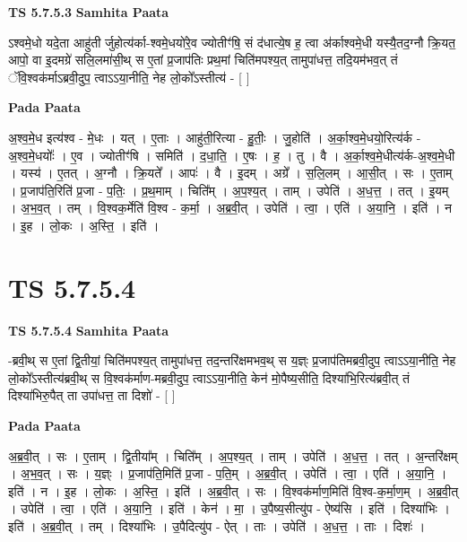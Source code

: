 \documentclass[17pt]{extarticle}
\begin{document}
\textbf{TS 5.7.5.3 } \newline
\textbf{Samhita Paata} \newline

ऽश्वमे॒धो यदे॒ता आहु॑ती र्जुहोत्य॑र्का-श्वमे॒धयो॑रे॒व ज्योतीꣳ॑षि॒ सं द॑धात्ये॒ष ह॒ त्वा अ॑र्काश्वमे॒धी यस्यै॒तद॒ग्नौ क्रि॒यत॒ आपो॒ वा इ॒दमग्रे॑ सलि॒लमा॑सी॒थ् स ए॒तां प्र॒जाप॑तिः प्रथ॒मां चिति॑मपश्य॒त् तामुपा॑धत्त॒ तदि॒यम॑भव॒त् तं ॅवि॒श्वक॑र्माऽब्रवी॒दुप॒ त्वाऽऽया॒नीति॒ नेह लो॒को᳚ऽस्तीत्य॑ - [  ] \newline

\textbf{Pada Paata} \newline

अ॒श्व॒मे॒ध इत्य॑श्व - मे॒धः । यत् । ए॒ताः । आहु॑ती॒रित्या - हु॒तीः॒ । जु॒होति॑ । अ॒र्का॒श्व॒मे॒धयो॒रित्य॑र्क - अ॒श्व॒मे॒धयोः᳚ । ए॒व । ज्योतीꣳ॑षि । समिति॑ । द॒धा॒ति॒ । ए॒षः । ह॒ । तु । वै । अ॒र्का॒श्व॒मे॒धीत्य॑र्क-अ॒श्व॒मे॒धी । यस्य॑ । ए॒तत् । अ॒ग्नौ । क्रि॒यते᳚ । आपः॑ । वै । इ॒दम् । अग्रे᳚ । स॒लि॒लम् । आ॒सी॒त् । सः । ए॒ताम् । प्र॒जाप॑ति॒रिति॑ प्र॒जा - प॒तिः॒ । प्र॒थ॒माम् । चिति᳚म् । अ॒प॒श्य॒त् । ताम् । उपेति॑ । अ॒ध॒त्त॒ । तत् । इ॒यम् । अ॒भ॒व॒त् । तम् । वि॒श्वक॒र्मेति॑ वि॒श्व - क॒र्मा॒ । अ॒ब्र॒वी॒त् । उपेति॑ । त्वा॒ । एति॑ । अ॒या॒नि॒ । इति॑ । न । इ॒ह । लो॒कः । अ॒स्ति॒ । इति॑ ।  \newline




\section*{ TS 5.7.5.4 }

\textbf{TS 5.7.5.4 } \newline
\textbf{Samhita Paata} \newline

-ब्रवी॒थ् स ए॒तां द्वि॒तीयां॒ चिति॑मपश्य॒त् तामुपा॑धत्त॒ तद॒न्तरि॑क्षमभव॒थ् स य॒ज्ञ्ः प्र॒जाप॑तिमब्रवी॒दुप॒ त्वाऽऽया॒नीति॒ नेह लो॒को᳚ऽस्तीत्य॑ब्रवी॒थ् स वि॒श्वक॑र्माण-मब्रवी॒दुप॒ त्वाऽऽया॒नीति॒ केन॑ मो॒पैष्य॒सीति॒ दिश्या॑भि॒रित्य॑ब्रवी॒त् तं दिश्या॑भिरु॒पैत् ता उपा॑धत्त॒ ता दिशो॑ - [  ] \newline

\textbf{Pada Paata} \newline

अ॒ब्र॒वी॒त् । सः । ए॒ताम् । द्वि॒तीया᳚म् । चिति᳚म् । अ॒प॒श्य॒त् । ताम् । उपेति॑ । अ॒ध॒त्त॒ । तत् । अ॒न्तरि॑क्षम् । अ॒भ॒व॒त् । सः । य॒ज्ञ्ः । प्र॒जाप॑ति॒मिति॑ प्र॒जा - प॒ति॒म् । अ॒ब्र॒वी॒त् । उपेति॑ । त्वा॒ । एति॑ । अ॒या॒नि॒ । इति॑ । न । इ॒ह । लो॒कः । अ॒स्ति॒ । इति॑ । अ॒ब्र॒वी॒त् । सः । वि॒श्वक॑र्माण॒मिति॑ वि॒श्व-क॒र्मा॒ण॒म् । अ॒ब्र॒वी॒त् । उपेति॑ । त्वा॒ । एति॑ । अ॒या॒नि॒ । इति॑ । केन॑ । मा॒ । उ॒पैष्य॒सीत्यु॑प - ऐष्य॑सि । इति॑ । दिश्या॑भिः । इति॑ । अ॒ब्र॒वी॒त् । तम् । दिश्या॑भिः । उ॒पैदित्यु॑प - ऐत् । ताः । उपेति॑ । अ॒ध॒त्त॒ । ताः । दिशः॑ ।  \newline
\end{document}
